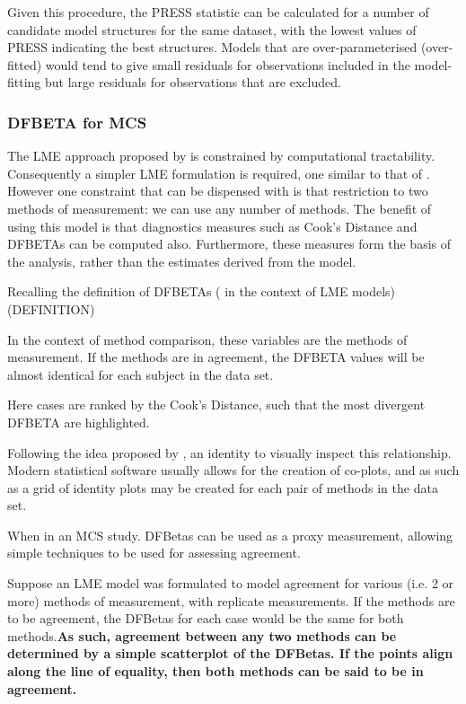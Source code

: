 \documentclass[12pt, a4paper]{report}
\theoremstyle{plain}
\theoremstyle{definition}
\theoremstyle{remark}
\begin{document}
	Given this procedure, the PRESS statistic can be calculated for a number of candidate model structures for the same dataset, with the lowest values of PRESS indicating the best structures. Models that are over-parameterised (over-fitted) would tend to give small residuals for observations included in the model-fitting but large residuals for observations that are excluded.
	




	\subsubsection{DFBETA for MCS}
	The LME approach proposed by \citet{ARoy2009} is constrained by computational tractability.
	Consequently a simpler LME formulation is required, one similar to that of \citet{BXC2008}. However one constraint that can be dispensed with is that restriction to
	two methods of measurement: we can use any number of methods.
	The benefit of using this model is that diagnostics measures such as Cook's Distance and DFBETAs can be computed also. Furthermore, these measures
	form the basis of the analysis, rather than the estimates derived from the model.
	
	Recalling the definition of DFBETAs ( in the context of LME models) (DEFINITION)
	
	In the context of method comparison, these variables are the methods of measurement. If the methods are in agreement, the DFBETA values will be almost identical for each subject in
	the data set.
	
	Here cases are ranked by the Cook's Distance, such that the most divergent DFBETA are highlighted.
	
	
	
	Following the idea proposed by \citet{BA86}, an identity to visually inspect this relationship. Modern statistical software usually allows for the creation of co-plots, and as such as
	a grid of identity plots may be created for each pair of methods in the data set.
	
	
	When in an MCS study. DFBetas can be used as a proxy measurement, allowing simple techniques to be used for assessing agreement.
	
	Suppose an LME model was formulated to model agreement for various (i.e. 2 or more) methods of measurement, with replicate measurements. If the methods are to be agreement, the DFBetas for each case would be the same for both methods.\textbf{As such, agreement between any two methods can be determined by a simple scatterplot of the DFBetas. If the points align along the line of equality, then both methods can be said to be in agreement.}
	
\end{document}
